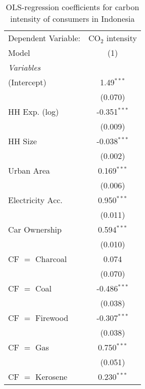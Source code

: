 
\begin{table}[htbp!]
   \centering
   \small
   \begin{adjustbox}{width = 1\textwidth, max height = 0.95\textheight, center}
      \begin{threeparttable}[b]
         \caption{\label{tab:OLS_1_IDN} OLS-regression coefficients for carbon intensity of consumers in Indonesia}
         \begin{tabular}{lc}
            \tabularnewline \midrule \midrule
            Dependent Variable: & CO$_{2}$ intensity\\  
            Model               & (1)\\  
            \midrule
            \emph{Variables}\\
            (Intercept)         & 1.49$^{***}$\\   
                                & (0.070)\\   
            HH Exp. (log)       & -0.351$^{***}$\\   
                                & (0.009)\\   
            HH Size             & -0.038$^{***}$\\   
                                & (0.002)\\   
            Urban Area          & 0.169$^{***}$\\   
                                & (0.006)\\   
            Electricity Acc.    & 0.950$^{***}$\\   
                                & (0.011)\\   
            Car Ownership       & 0.594$^{***}$\\   
                                & (0.010)\\   
            CF $=$ Charcoal     & 0.074\\   
                                & (0.070)\\   
            CF $=$ Coal         & -0.486$^{***}$\\   
                                & (0.038)\\   
            CF $=$ Firewood     & -0.307$^{***}$\\   
                                & (0.038)\\   
            CF $=$ Gas          & 0.750$^{***}$\\   
                                & (0.051)\\   
            CF $=$ Kerosene     & 0.230$^{***}$\\   

\end{tabular}
\end{threeparttable}
\end{adjustbox}
\end{table}
